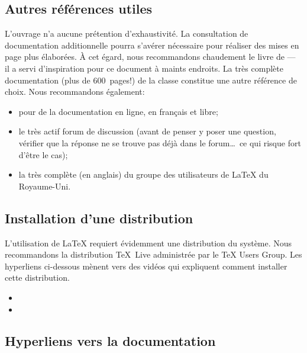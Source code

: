 \subsection*{Autres références utiles}

L'ouvrage n'a aucune prétention d'exhaustivité. La consultation de
documentation additionnelle pourra s'avérer nécessaire pour réaliser
des mises en page plus élaborées. À cet égard, nous recommandons
chaudement le livre de \citet{Kopka:latex:4e} --- il a servi
d'inspiration pour ce document à maints endroits. La très complète
documentation (plus de 600~pages!) de la classe 
\citep{memoir} constitue une autre référence de choix. Nous
recommandons également:
\begin{itemize}
\item {} pour de la documentation en ligne, en français et
  libre;
\item le très actif forum de discussion
  (avant de penser y poser une question, vérifier que la réponse ne se trouve
  pas déjà dans le forum\dots\ ce qui risque fort d'être le cas);
\item la très complète
   (en anglais) du groupe des
  utilisateurs de {\LaTeX} du Royaume-Uni.
\end{itemize}

\subsection*{Installation d'une distribution}

L'utilisation de {\LaTeX} requiert évidemment une distribution du
système. Nous recommandons la distribution {\TeX}~Live administrée par
le {\TeX} Users Group. Les hyperliens ci-dessous mènent vers des
vidéos qui expliquent comment installer cette distribution.
\begin{itemize}
\item {}
\item {}
\end{itemize}

\subsection*{Hyperliens vers la documentation}

